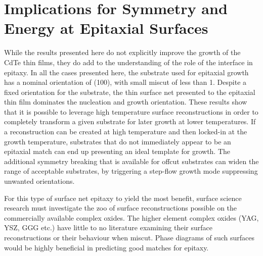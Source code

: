 \section{Implications for Symmetry and Energy at Epitaxial Surfaces}
While the results presented here do not explicitly improve the growth of the CdTe thin films, they do add to the understanding of the role of the interface in epitaxy.
In all the cases presented here, the substrate used for epitaxial growth has a nominal orientation of (100), with small miscut of less than 1\degree{}.
Despite a fixed orientation for the substrate, the thin surface net presented to the epitaxial thin film dominates the nucleation and growth orientation.
These results show that it is possible to leverage high temperature surface reconstructions in order to completely transform a given substrate for later growth at lower temperatures.
If a reconstruction can be created at high temperature and then locked-in at the growth temperature, substrates that do not immediately appear to be an epitaxial match can end up presenting an ideal template for growth.
The additional symmetry breaking that is available for offcut substrates can widen the range of acceptable substrates, by triggering a step-flow growth mode suppressing unwanted orientations.

For this type of surface net epitaxy to yield the most benefit, surface science research must investigate the zoo of surface reconstructions possible on the commercially available complex oxides.
The higher element complex oxides (YAG, YSZ, GGG etc.) have little to no literature examining their surface reconstructions or their behaviour when miscut.
Phase diagrams of such surfaces would be highly beneficial in predicting good matches for epitaxy.
